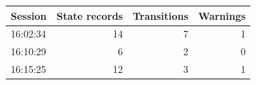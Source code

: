 \begin{tabular}{lrrr}
\hline
Session & State records & Transitions & Warnings \\
\hline
16:02:34 & 14 & 7 & 1 \\
16:10:29 & 6 & 2 & 0 \\
16:15:25 & 12 & 3 & 1 \\
\hline
\end{tabular}

